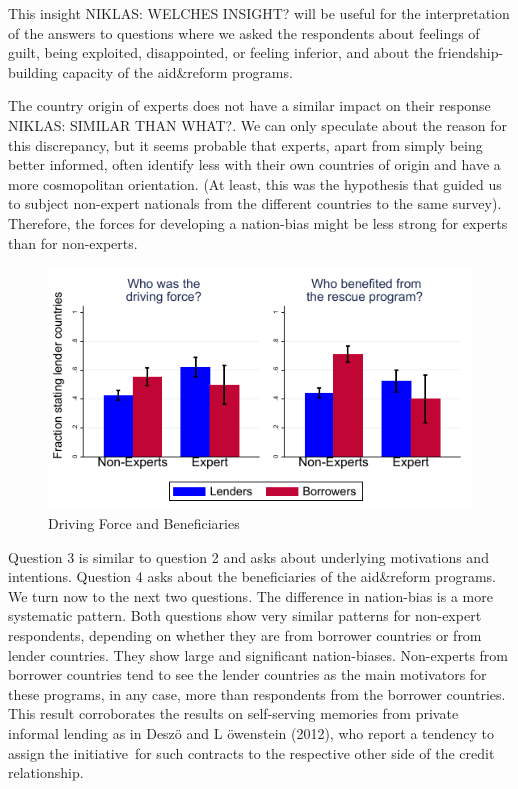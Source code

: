 This insight NIKLAS: WELCHES INSIGHT? will be useful for the
interpretation of the answers to questions where we asked the respondents
about feelings of guilt, being exploited, disappointed, or feeling inferior,
and about the friendship-building capacity of the aid\&reform programs.

The country origin of experts does not have a
similar impact on their response NIKLAS: SIMILAR THAN WHAT?. We can only speculate about the reason for
this discrepancy, but it seems probable that experts, apart from simply being
better informed, often identify less with their own countries of origin and have 
a more cosmopolitan orientation. (At
least, this was the hypothesis that guided us to subject non-expert
nationals from the different countries to the same survey). Therefore, the
forces for developing a nation-bias might be less strong for experts than for non-experts. 

\begin{figure}
    \centering
      \caption{Driving Force and Beneficiaries}
    \includegraphics[scale=1.2]{graph3.pdf}
  
    \label{fig:my_label}
\end{figure}
Question 3 is similar to question 2 and asks about underlying motivations
and intentions. Question 4 asks about the beneficiaries of the aid\&reform
programs.  We
turn now to the next two questions. The difference in nation-bias is a more systematic pattern. Both questions show very similar patterns for non-expert
respondents, depending on whether they are from borrower countries or from
lender countries. They show large and significant nation-biases. Non-experts
from borrower countries tend to see the lender countries as the main
motivators for these programs, in any case, more than respondents from the
borrower countries. This result corroborates the results on
self-serving memories from private informal lending as in Desz\"{o} and L%
\"{o}wenstein (2012), who report a tendency to assign the initiative\
for such contracts to the respective other side of the credit relationship. 

